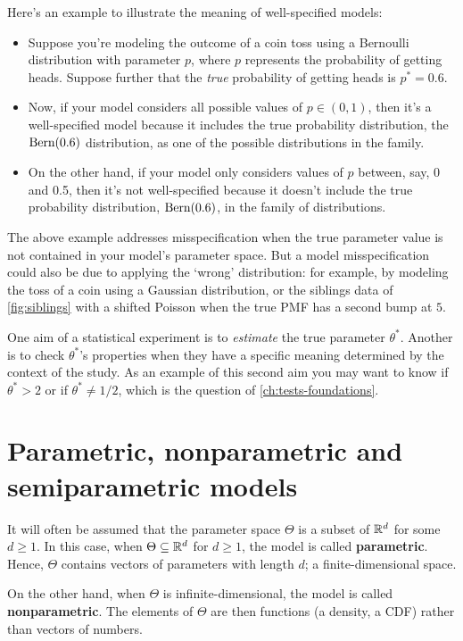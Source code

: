 Here's an example to illustrate the meaning of well-specified models:
\begin{itemize}
\item Suppose you're modeling the outcome of a coin toss using a Bernoulli distribution with parameter $p$, where $p$ represents the probability of getting heads.
Suppose further that the \textit{true} probability of getting heads is $p^* = 0.6$.
\item Now, if your model considers all possible values of $p \in (0,1)$, then it's a well-specified model because it includes the true probability distribution, the $\text{Bern}(0.6)$ distribution, as one of the possible distributions in the family.
\item On the other hand, if your model only considers values of $p$ between, say, 0 and 0.5, then it's not well-specified because it doesn't include the true probability distribution, $\text{Bern}(0.6)$, in the family of distributions.
\end{itemize}

The above example addresses misspecification when the true parameter value is not contained in your model's parameter space.
But a model misspecification could also be due to applying the `wrong' distribution: for example, by modeling the toss of a coin using a Gaussian distribution, or the siblings data of \cref{fig:siblings} with a shifted Poisson when the true PMF has a second bump at $5$.

One aim of a statistical experiment is to \textit{estimate} the true parameter $\theta^*$.
Another is to check $\theta^*$'s properties when they have a specific meaning determined by the context of the study.
As an example of this second aim you may want to know if $\theta^* > 2$ or if $\theta^* \neq 1/2$, which is the question of \cref{ch:tests-foundations}.

\section{Parametric, nonparametric and semiparametric models}
\label{sec:models-parametric}

It will often be assumed that the parameter space $\Theta$ is a subset of $\mathbb{R}^d$ for some $d \geq 1$.
In this case, when $\Theta \subseteq \mathbb{R}^d$ for $d \geq 1$, the model is called \textbf{parametric}.
Hence, $\Theta$ contains vectors of parameters with length $d$; a finite-dimensional space.

On the other hand, when $\Theta$ is infinite-dimensional, the model is called \textbf{nonparametric}.
The elements of $\Theta$ are then functions (a density, a CDF) rather than vectors of numbers.

